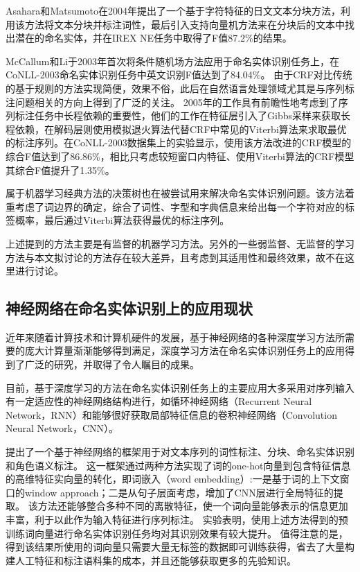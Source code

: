 Asahara和Matsumoto\citep{asahara2003japanese}在2004年提出了一个基于字符特征的日文文本分块方法，利用该方法将文本分块并标注词性，最后引入支持向量机方法来在分块后的文本中找出潜在的命名实体，并在IREX NE任务中取得了F值87.2\%的结果。

McCallum和Li\citep{mccallum2003early}于2003年首次将条件随机场方法应用于命名实体识别任务上，在CoNLL-2003命名实体识别任务中英文识别F值达到了84.04\%。
由于CRF对比传统的基于规则的方法实现简便，效果不俗，此后在自然语言处理领域尤其是与序列标注问题相关的方向上得到了广泛的关注。
2005年\citet{finkel2005incorporating}的工作具有前瞻性地考虑到了序列标注任务中长程依赖的重要性，他们的工作在特征层引入了Gibbs采样来获取长程依赖，在解码层则使用模拟退火算法代替CRF中常见的Viterbi算法来求取最优的标注序列。在CoNLL-2003数据集上的实验显示，使用该方法改进的CRF模型的综合F值达到了86.86\%，相比只考虑较短窗口内特征、使用Viterbi算法的CRF模型其综合F值提升了1.35\%。

属于机器学习经典方法的决策树也在被\citet{sekine1998decision}尝试用来解决命名实体识别问题。该方法着重考虑了词边界的确定，综合了词性、字型和字典信息来给出每一个字符对应的标签概率，最后通过Viterbi算法获得最优的标注序列。

上述提到的方法主要是有监督的机器学习方法。另外的一些弱监督、无监督的学习方法与本文拟讨论的方法存在较大差异，且考虑到其适用性和最终效果，故不在这里进行讨论。

\subsection{神经网络在命名实体识别上的应用现状}
近年来随着计算技术和计算机硬件的发展，基于神经网络的各种深度学习方法所需要的庞大计算量渐渐能够得到满足，深度学习方法在命名实体识别任务上的应用得到了广泛的研究，并取得了令人瞩目的成果。

目前，基于深度学习的方法在命名实体识别任务上的主要应用大多采用对序列输入有一定适应性的神经网络结构进行，如循环神经网络（Recurrent Neural Network，RNN）和能够很好获取局部特征信息的卷积神经网络（Convolution Neural Network，CNN）。

\citet{collobert2011natural}提出了一个基于神经网络的框架用于对文本序列的词性标注、分块、命名实体识别和角色语义标注。
这一框架通过两种方法实现了词的one-hot向量到包含特征信息的高维特征实向量的转化，即词嵌入（word embedding）:一是基于词的上下文窗口的window approach；二是从句子层面考虑，增加了CNN层进行全局特征的提取。
该方法还能够整合多种不同的离散特征，使一个词向量能够表示的信息更加丰富，利于以此作为输入特征进行序列标注。
实验表明，使用上述方法得到的预训练词向量进行命名实体识别任务均对其识别效果有较大提升。
值得注意的是，得到该结果所使用的词向量只需要大量无标签的数据即可训练获得，省去了大量构建人工特征和标注语料集的成本，并且还能够获取更多的先验知识。

